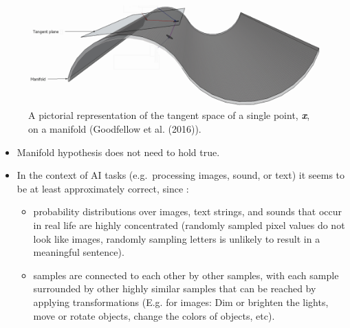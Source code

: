 \begin{vbframe}
\begin{itemize}
\end{itemize} 
        \begin{figure}[h]
            \centering
            \includegraphics[width=0.8\linewidth]{plots/tangent_plane.png}
            \caption{A pictorial representation of the tangent space of a single point, \textbf{\textit{x}}, on a manifold (Goodfellow et al. (2016)).}
        \end{figure}
     
       \framebreak
       
      
        \begin{itemize}
        \item Manifold hypothesis does not need to  hold true.
        \item In the context of AI tasks (e.g.~processing images, sound, or text) it seems to be at least approximately correct, since :
        \begin{itemize}
        \item probability distributions over images, text strings, and sounds that occur in real life are highly concentrated (randomly sampled pixel values do not look like images, randomly sampling letters is unlikely to result in a meaningful sentence).
        \item samples are connected to each other by other samples, with each sample surrounded by other highly similar samples that can be reached by applying transformations (E.g. for images: Dim or brighten the lights, move or rotate objects, change the colors of objects,  etc).
     \end{itemize}
    \end{itemize} 

\end{vbframe}




